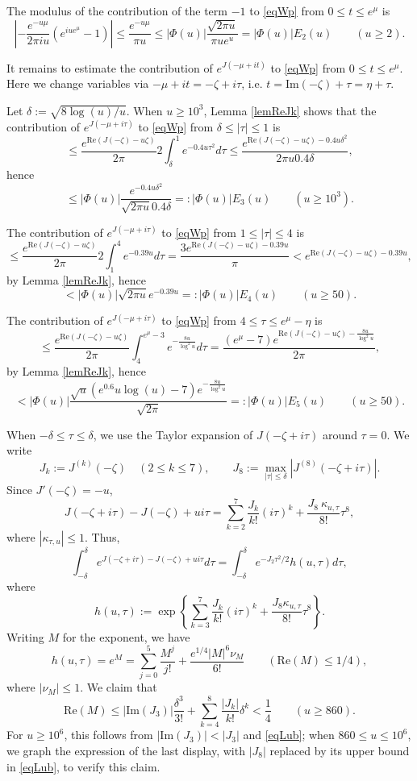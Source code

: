 \documentclass[11pt]{amsart}
\begin{document}
The modulus of the contribution of the term $-1$ to \eqref{eqWp} from $0 \le t \le e^\mu$ is
$$
\left| - \frac{e^{-u \mu}}{2\pi iu}(e^{iu e^\mu}-1) \right| \le  \frac{e^{-u \mu}}{\pi u} 
\le  |\Phi(u)|\frac{\sqrt{2 \pi u}}{\pi u e^u}
= |\Phi(u)| E_2(u) \qquad (u\ge 2).
$$

It remains to estimate the contribution of $e^{J(-\mu+it)}$ to   \eqref{eqWp} from $0 \le t \le e^\mu$.
Here we change variables via $-\mu+it= -\zeta+i\tau$, i.e. $t = \mathrm{Im}(-\zeta) +\tau = \eta+\tau $. 

Let $\delta:= \sqrt{8\log(u)/u}$. When $u\ge 10^3$, Lemma \ref{lemReJk} shows that
 the contribution of $e^{J(-\mu+i\tau)}$ to   \eqref{eqWp} from $\delta \le |\tau|\le 1$ is
$$
\le \frac{e^{\mathrm{Re} (J(-\zeta)-u\zeta)}}{2\pi} 2 \int_\delta^{1}e^{-0.4 u\tau^2}d\tau
\le \frac{e^{\mathrm{Re} (J(-\zeta)-u\zeta) -0.4u \delta^2}}{2\pi u 0.4\delta },
$$
hence
$$
\le |\Phi(u)| \frac{e^{ -0.4 u \delta^2}}{\sqrt{2\pi u}0.4\delta }=:|\Phi(u)| E_3(u) \qquad (u\ge 10^3).
$$

The contribution  of $e^{J(-\mu+i\tau)}$ to   \eqref{eqWp} from $1 \le |\tau| \le 4$ is 
$$
\le \frac{e^{\mathrm{Re} (J(-\zeta)-u\zeta)}}{2\pi} 2 \int_1^{4}e^{-0.39 u}d\tau
= \frac{3e^{\mathrm{Re} (J(-\zeta)-u\zeta) -0.39u }}{\pi }<e^{\mathrm{Re} (J(-\zeta)-u\zeta) -0.39u },
$$
by Lemma \ref{lemReJk}, hence
$$
<  |\Phi(u)|  \sqrt{2\pi u}e^{-0.39u}=:  |\Phi(u)| E_4(u) \qquad (u\ge 50).
$$

The contribution  of $e^{J(-\mu+i\tau)}$ to   \eqref{eqWp} from $4 \le \tau \le e^\mu -\eta$ is
$$
\le \frac{e^{\mathrm{Re} (J(-\zeta)-u\zeta)}}{2\pi}  \int_4^{e^\mu -3}e^{- \frac{8u}{\log^2 u}}d\tau
= \frac{ (e^ \mu - 7) e^{\mathrm{Re} (J(-\zeta)-u\zeta) - \frac{8u}{\log^2 u} }}{2\pi },
$$
by Lemma \ref{lemReJk}, hence
$$
<  |\Phi(u)|  \frac{\sqrt{ u}  (e^{0.6} u\log(u)- 7) e^{ - \frac{8u}{\log^2 u} }}{\sqrt{2\pi} }=:  |\Phi(u)| E_5(u) \qquad (u\ge 50).
$$

When $-\delta \le \tau \le \delta$, we use the Taylor expansion of $J(-\zeta+i\tau)$ around $\tau=0$.
We write
$$
J_k:=J^{(k)}(-\zeta) \quad (2 \le k \le 7), \qquad J_8:=\max_{|\tau|\le \delta}|J^{(8)}(-\zeta +i\tau)|.
$$
 Since
 $J'(-\zeta)=-u$,
$$
J(-\zeta+i\tau)-J(-\zeta)+ui\tau = \sum_{k=2}^7 \frac{J_k}{k!}(i\tau)^k + \frac{J_8\ \kappa_{u,\tau}}{8!} \tau^8,
$$
where $|\kappa_{\tau,u}|\le 1$. 
Thus,
\begin{equation}\label{eqhint}
\int_{-\delta}^{\delta} e^{J(-\zeta+i\tau)-J(-\zeta)+ui\tau }d\tau = \int_{-\delta}^\delta e^{-J_2\tau^2/2}h(u,\tau)d\tau, 
\end{equation}
where 
$$
h(u,\tau):= \exp\left\{ \sum_{k=3}^7 \frac{J_k}{k!}(i\tau)^k + \frac{J_8\kappa_{u,\tau}}{8!} \tau^8\right\}.
$$
Writing $M$ for the exponent, we have
$$
h(u,\tau)=e^M=\sum_{j=0}^5 \frac{M^j}{j!}+\frac{e^{1/4} |M|^6 \nu_M}{6!} \qquad (\mathrm{Re}( M)  \le 1/4),
$$
where $|\nu_M|\le 1$. 
We claim that 
$$
\mathrm{Re}( M)  \le |\mathrm{Im}( J_3)|  \frac{\delta^3}{3!}+\sum_{k=4}^8 \frac{|J_k|}{k!}\delta^k < \frac{1}{4}
\qquad (u\ge 860).
$$
For $u\ge 10^6$, this follows from $ |\mathrm{Im}( J_3)| < |J_3|$ and  \eqref{eqLub};
when $860\le u \le 10^6$, we graph the expression of the 
last display, with $|J_8|$ replaced by its upper bound in \eqref{eqLub}, to verify this claim.
\end{document}
